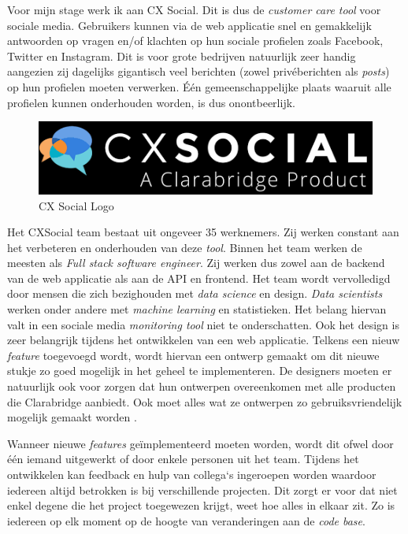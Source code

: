 Voor mijn stage werk ik aan CX Social. Dit is dus de \textit{customer care tool} voor sociale media. Gebruikers kunnen via de web applicatie snel en gemakkelijk antwoorden op vragen en/of klachten op hun sociale profielen zoals Facebook, Twitter en Instagram. Dit is voor grote bedrijven natuurlijk zeer handig aangezien zij dagelijks gigantisch veel berichten (zowel priv\'{e}berichten als \textit{posts}) op hun profielen moeten verwerken. \'{E}\'{e}n gemeenschappelijke plaats waaruit alle profielen kunnen onderhouden worden, is dus onontbeerlijk. 

\begin{figure}[H]
	\centering
	\includegraphics[width=1\textwidth]{Figuren/CXSocialLogo.png}
	\caption{CX Social Logo \cite{CXSOcialLogo}} 
	\label{fig:CXSocialLogo}
\end{figure} 

Het CXSocial team bestaat uit ongeveer 35 werknemers. Zij werken constant aan het verbeteren en onderhouden van deze \textit{tool}.  Binnen het team werken de meesten als \textit{Full stack software engineer}. Zij werken dus zowel aan de backend van de web applicatie als aan de API en frontend. Het team wordt vervolledigd door mensen die zich bezighouden met \textit{data science} en design. \textit{Data scientists} werken onder andere met \textit{machine learning} en statistieken. Het belang hiervan valt in een sociale media \textit{monitoring tool} niet te onderschatten. Ook het design is zeer belangrijk tijdens het ontwikkelen van een web applicatie. Telkens een nieuw \textit{feature} toegevoegd wordt, wordt hiervan een ontwerp gemaakt om dit nieuwe stukje zo goed mogelijk in het geheel te implementeren. De designers moeten er natuurlijk ook voor zorgen dat hun ontwerpen overeenkomen met alle producten die Clarabridge aanbiedt. Ook moet alles wat ze ontwerpen zo gebruiksvriendelijk mogelijk gemaakt worden \cite{EngagorTeam}. 

Wanneer nieuwe \textit{features} ge\"{i}mplementeerd moeten worden, wordt dit ofwel door \'{e}\'{e}n iemand uitgewerkt of door enkele personen uit het team. Tijdens het ontwikkelen kan feedback en hulp van collega`s ingeroepen worden waardoor iedereen altijd betrokken is bij verschillende projecten. Dit zorgt er voor dat niet enkel degene die het project toegewezen krijgt, weet hoe alles in elkaar zit. Zo is iedereen op elk moment op de hoogte van veranderingen aan de \textit{code base}. 

